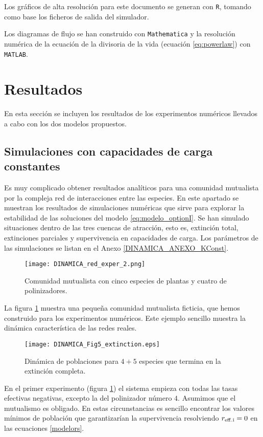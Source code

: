 Los gráficos de alta resolución para este documento se generan con \texttt{R}, tomando como base los ficheros de salida del simulador. 

Los diagramas de flujo se han construido con \texttt{Mathematica} y la resolución numérica de la ecuación de la divisoria de la vida (ecuación \ref{eq:powerlaw}) con \texttt{MATLAB}.

\section{Resultados}

En esta sección se incluyen los resultados de los experimentos numéricos llevados a cabo con los dos modelos propuestos.

\subsection{Simulaciones con capacidades de carga constantes}
\label{results_K_constante}
Es muy complicado obtener resultados analíticos para una comunidad mutualista por la compleja red de interacciones entre las especies. En este apartado se muestran los resultados de simulaciones numéricas que sirve para explorar la estabilidad de las soluciones del modelo \ref{eq:modelo_optionI}. Se han simulado situaciones dentro de las tres cuencas de atracción, esto es, extinción total, extinciones parciales y supervivencia en capacidades de carga. Los parámetros de las simulaciones se listan en el Anexo \ref{DINAMICA_ANEXO_KConst}.

\begin{figure}[h!]
\centering
\texttt{[image: DINAMICA\_red\_exper\_2.png]}
\caption {Comunidad mutualista con cinco especies de plantas y cuatro de polinizadores.}
\label{fig:red_exper_stab1}
\end{figure}

La figura \ref{fig:red_exper_stab1} muestra una pequeña comunidad mutualista ficticia, que hemos construido para los experimentos numéricos. Este ejemplo sencillo muestra la dinámica característica de las redes reales.

\begin{figure}[ht!]
\centering
\texttt{[image: DINAMICA\_Fig5\_extinction.eps]}
\caption {Dinámica de poblaciones para $4+5$ especies que termina en la extinción completa.}
\label{fig:exper_stab1}
\end{figure}

En el primer experimento (figura \ref{fig:red_exper_stab1}) el sistema empieza con todas las tasas efectivas negativas, excepto la del polinizador número $4$. Asumimos que el mutualismo es obligado. En estas circunstancias es sencillo encontrar los valores mínimos de población que garantizarían la supervivencia resolviendo $r_{\rm{eff}.i} = 0$ en las ecuaciones \ref{modelors}.

